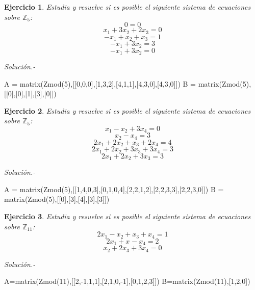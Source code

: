 \documentclass{amsart}
\newtheorem{ejer}{Ejercicio}
\def\z{\mathbb{Z}}
\begin{document}


\begin{ejer} Estudia y resuelve si es posible el siguiente sistema de ecuaciones sobre $\z _5$:
\[ 0 = 0 \]
\[ x_{1} + 3 x_{2} + 2 x_{3} = 0 \]
\[ -x_{1} + x_{2} + x_{3} = 1 \]
\[ -x_{1} + 3 x_{2} = 3 \]
\[ -x_{1} + 3 x_{2} = 0 \]
\end{ejer}

{\it Soluci\'on.- }


\begin{sageblock}
A = matrix(Zmod(5),[[0,0,0],[1,3,2],[4,1,1],[4,3,0],[4,3,0]])
B = matrix(Zmod(5),[[0],[0],[1],[3],[0]])

\end{sageblock}





\begin{ejer} Estudia y resuelve si es posible el siguiente sistema de ecuaciones sobre $\z _5$:
\[ x_{1} - x_{2} + 3 x_{4} = 0 \]
\[ x_{2} - x_{4} = 3 \]
\[ 2 x_{1} + 2 x_{2} + x_{3} + 2 x_{4} = 4 \]
\[ 2 x_{1} + 2 x_{2} + 3 x_{3} + 3 x_{4} = 3 \]
\[ 2 x_{1} + 2 x_{2} + 3 x_{3} = 3 \]
\end{ejer}

{\it Soluci\'on.- }

\begin{sageblock}
A = matrix(Zmod(5),[[1,4,0,3],[0,1,0,4],[2,2,1,2],[2,2,3,3],[2,2,3,0]])
B = matrix(Zmod(5),[[0],[3],[4],[3],[3]])

\end{sageblock}






\begin{ejer} Estudia y resuelve si es posible el siguiente sistema de ecuaciones sobre $\z _{11}$:
\[ 2x_{1} - x_{2} + x_{3} + x_{4} = 1 \]
\[ 2x_{1} + x_{} - x_{4} = 2 \]
\[ x_{2} + 2x_{3} + 3x_{4} = 0 \]
\end{ejer}
{\it Soluci\'on.- }

\begin{sageblock}
A=matrix(Zmod(11),[[2,-1,1,1],[2,1,0,-1],[0,1,2,3]])
B=matrix(Zmod(11),[1,2,0])

\end{sageblock}




\end{document}
